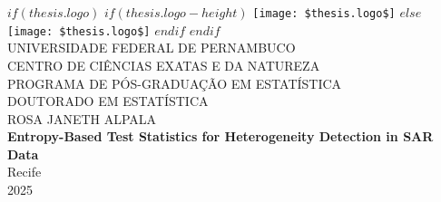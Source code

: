  \makeatletter
\renewcommand{\cleardoublepage}{\clearpage} %
\makeatother

\frontmatter %

\pagestyle{plain} %



\begin{titlepage}
  \begin{center}
  
			$if(thesis.logo)$
			$if(thesis.logo-height)$
			\texttt{[image: \$thesis.logo\$]} %
			$else$
			\texttt{[image: \$thesis.logo\$]}
			$endif$
			$endif$\\[0.3cm]
    
    {\large\MakeUppercase{UNIVERSIDADE FEDERAL DE PERNAMBUCO}}\\
    {\large\MakeUppercase{CENTRO DE CIÊNCIAS EXATAS E DA NATUREZA}}\\
    {\large\MakeUppercase{PROGRAMA DE PÓS-GRADUAÇÃO EM ESTATÍSTICA}}\\
    {\large\MakeUppercase{DOUTORADO EM ESTATÍSTICA}}\\[4cm]
		
    {\large ROSA JANETH ALPALA}\\[3cm]
    
    {\Large \textbf{Entropy-Based Test Statistics for Heterogeneity Detection in SAR Data}}\\[6cm]
    

		
%
   {\large Recife}\\
   {\large 2025}
    
  \end{center}
\end{titlepage}

